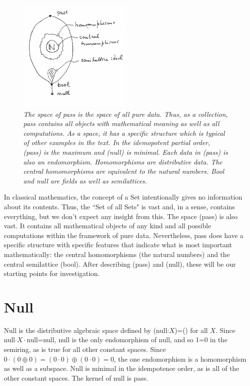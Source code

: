 \documentclass[11pt]{article}
\begin{document}
\begin{figure}[h]
\centering
\includegraphics[width=0.5\textwidth]{pass.pdf}
\caption{{\it The space of pass is the space of all pure data.  Thus, as a collection, pass contains all objects with mathematical 
meaning as well as all computations.  As a space, it has a specific structure which is typical of other examples in the text.  
In the idemopotent partial order, (pass) is the maximum and (null) is minimal.  Each data in (pass) is also an endomorphism.  Homomorphisms 
are distributive data.  The central homomorphisms are equivalent to the natural numbers.  Bool and null are fields as well as
semilattices.}}
\end{figure}

In classical mathematics, the concept of a Set intentionally gives no information about its contents.  Thus, the ``Set of all Sets" is vast and, in 
a sense, contains everything, but we don't expect any insight from this.  The space (pass) is also vast.  It contains all mathematical objects 
of any kind and all possible computations within the framework of pure data.  Nevertheless, pass does have a specific structure with specific 
features that indicate what is most important mathematically: the central homomorphisms (the natural numbers) and the central semilattice (bool).  
After describing (pass) and (null), these will be our starting points for investigation.  

\section{Null}

    Null is the distributive algebraic space defined by (null:$X$)=() for all $X$.  Since null$\cdot X\cdot$null=null, null is the only endomorphism 
of null, and so 1=0 in the semiring, as is true for all other constant spaces.  Since $0\cdot(0\oplus 0)=(0\cdot 0) \oplus (0\cdot 0)=0$, the one 
endomorphism is a homomorphism as well as a subspace. 
Null is minimal in the idempotence order, as is all of the 
other constant spaces.  The kernel of null is pass.  
\end{document}
